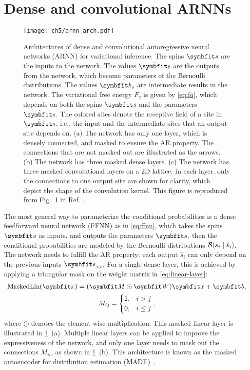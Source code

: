 \section{Dense and convolutional ARNNs}
\label{sec:made}

\begin{figure}[htb]
\centering
\texttt{[image: ch5/arnn\_arch.pdf]}
\caption[Architectures of autoregressive neural networks (ARNN)]{
Architectures of dense and convolutional autoregressive neural networks (ARNN) for variational inference.
The spins $\vs$ are the inputs to the network.
The values $\hat{\vs}$ are the outputs from the network, which become parameters of the Bernoulli distributions.
The values $\vh_i$ are intermediate results in the network.
The variational free energy $F_q$ is given by \cref{eq:fq}, which depends on both the spins $\vs$ and the parameters $\hat{\vs}$.
The colored sites denote the receptive field of a site in $\hat{\vs}$, i.e., the input and the intermediate sites that an output site depends on.
(a) The network has only one layer, which is densely connected, and masked to ensure the AR property. The connections that are not masked out are illustrated as the arrows.
(b) The network has three masked dense layers.
(c) The network has three masked convolutional layers on a 2D lattice. In each layer, only the connections to one output site are shown for clarity, which depict the shape of the convolution kernel.
This figure is reproduced from Fig.~1 in Ref.~\cite{wu2019solving}.
}
\label{fig:arnn-arch}
\end{figure}

The most general way to parameterize the conditional probabilities is a dense feedforward neural network (FFNN) as in \cref{eq:ffnn}, which takes the spins $\vs$ as inputs, and outputs the parameters $\hat{\vs}$, then the conditional probabilities are modeled by the Bernoulli distributions $\mathcal{B}(s_i \mid \hat{s}_i)$. The network needs to fulfill the AR property: each output $\hat{s}_i$ can only depend on the previous inputs $\vs_{< i}$. For a single dense layer, this is achieved by applying a triangular mask on the weight matrix in \cref{eq:linear-layer}:
\begin{gather}
\text{MaskedLin}(\vx) = (\mM \odot \mW) \vx + \mb, \\
M_{i j} = \begin{cases}
1, & i > j \\
0, & i \le j
\end{cases},
\end{gather}
where $\odot$ denotes the element-wise multiplication. This masked linear layer is illustrated in \cref{fig:arnn-arch}~(a). Multiple linear layers can be applied to improve the expressiveness of the network, and only one layer needs to mask out the connections $M_{i i}$, as shown in \cref{fig:arnn-arch}~(b). This architecture is known as the masked autoencoder for distribution estimation (MADE)~\cite{germain2015made}.

